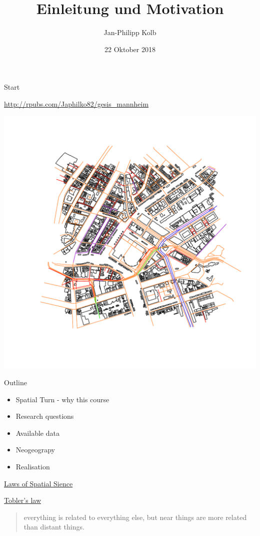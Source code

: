 \documentclass[ignorenonframetext,]{beamer}
\title{Einleitung und Motivation}
\author{Jan-Philipp Kolb}
\date{22 Oktober 2018}
\providecommand{\tightlist}{%
  \setlength{\itemsep}{0pt}\setlength{\parskip}{0pt}}
\begin{document}
\frame{\titlepage}

\begin{frame}{Start}
\protect\hypertarget{start}{}

\url{http://rpubs.com/Japhilko82/gesis_mannheim}

\includegraphics{figure/Amsterdam_osmplotr_highways.pdf}

\end{frame}

\begin{frame}{Outline}
\protect\hypertarget{outline}{}

\begin{itemize}
\tightlist
\item
  Spatial Turn - why this course
\item
  Research questions
\item
  Available data
\item
  Neogeograpy
\item
  Realisation
\end{itemize}

\end{frame}

\begin{frame}{\href{http://de.slideshare.net/rheimann04/big-social-data-the-spatial-turn-in-big-data}{Laws
of Spatial Sience}}
\protect\hypertarget{laws-of-spatial-sience}{}

\href{https://en.wikipedia.org/wiki/Tobler's_first_law_of_geography}{Tobler's
law}

\begin{quote}
everything is related to everything else, but near things are more
related than distant things.
\end{quote}

\end{frame}
\end{document}
